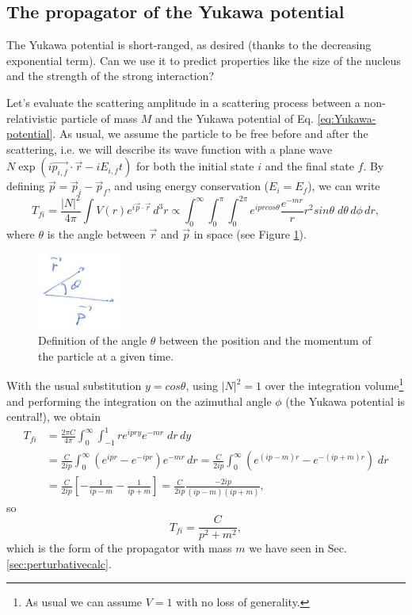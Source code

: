 \subsection{The propagator of the Yukawa potential}
The Yukawa potential is short-ranged, as desired (thanks to the decreasing exponential term). Can we use it to predict properties like the size of the nucleus and the strength of the strong interaction?

Let's evaluate the scattering amplitude in a scattering process between a non-relativistic particle of mass $M$ and the Yukawa potential of Eq. \eqref{eq:Yukawa-potential}. As usual, we assume the particle to be free before and after the scattering, i.e. we will describe its wave function with a plane wave \(N \exp{(i\Vec{p_{i,f}}\cdot\Vec{r}-iE_{i,f}t)}\) for both the initial state $i$ and the final state $f$. By defining $\Vec{p} = \Vec{p}_i - \Vec{p}_f$, and using energy conservation ($E_i=E_f$), we can write
\begin{equation*}
    T_{fi} = \frac{|N|^2}{4\pi}\int V(r)e^{i\Vec{p}\cdot\Vec{r}}\,d^3r \propto \int_0^\infty\int_0^\pi\int_0^{2\pi}e^{iprcos\theta}\frac{e^{-mr}}{r}r^2 sin\theta\;d\theta\,d\phi\,dr,
\end{equation*}
where $\theta$ is the angle between $\Vec{r}$ and $\Vec{p}$ in  space (see Figure \ref{fig:rp-angle}).\\
\begin{figure}[h]
    \includegraphics[width=0.25\textwidth]{Figures/rp-angle}
    \caption{Definition of the angle $\theta$ between the position and the momentum of the particle at a given time. }
    \label{fig:rp-angle}
\end{figure}

With the usual substitution $y = cos\theta$, using $|N|^2 = 1$ over the integration volume\footnote{As usual we can assume $V=1$ with no loss of generality.} and performing the integration on the azimuthal angle $\phi$ (the Yukawa potential is central!), we obtain
\begin{equation*}
\begin{split}
     T_{fi} & = \frac{2 \pi C}{4\pi}\int_0^{\infty}\int_{-1}^{1}re^{ipry}e^{-mr}\;dr\,dy \\
     & = \frac{C}{2ip}\int_0^{\infty} (e^{ipr}-e^{-ipr})e^{-mr}\,dr = \frac{C}{2ip}\int_0^\infty (e^{(ip-m)r} - e^{-(ip+m)r})\;dr \\
     & = \frac{C}{2ip}\left[-\frac{1}{ip-m}-\frac{1}{ip+m}\right] = \frac{C}{2ip}\frac{-2ip}{(ip-m)(ip+m)},
\end{split}
\end{equation*}
so
\begin{equation*}
    T_{fi} = \frac{C}{p^2+m^2},
\end{equation*}
which is the form of the propagator with mass $m$ we have seen in Sec. \ref{sec:perturbativecalc}.

